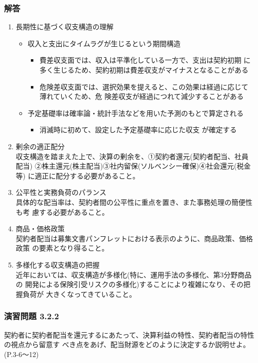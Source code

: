 \documentclass[report,gutter=10mm,fore-edge=10mm,uplatex,dvipdfmx]{jlreq}
\begin{document}
\subsubsection{解答}
\begin{enumerate}
 \item 長期性に基づく収支構造の理解
\begin{itemize}
 \item 収入と支出にタイムラグが生じるという期間構造
\begin{itemize}
 \item 費差収支面では、収入は平準化している一方で、支出は契約初期
に多く生じるため、契約初期は費差収支がマイナスとなることがある
 \item 危険差収支面では、選択効果を提えると、この効果は経過に応じて薄れていくため、危
険差収支が経過につれて減少することがある
\end{itemize}
 \item 予定基礎率は確率論・統計手法などを用いた予測のもとで算定される
\begin{itemize}
 \item 消滅時に初めて、設定した予定基礎率に応じた収支
が確定する
\end{itemize}
\end{itemize}
 \item 剰余の適正配分\\
収支構造を踏まえた上で、決算の剰余を、①契約者還元(契約者配当、社員配当)
②株主還元(株主配当)③社内留保(ソルベンシー確保)④社会還元(税金等)
に適正に配分する必要があること。
 \item 公平性と実務負荷のパランス\\
具体的な配当率は、契約者間の公平性に重点を置き、また事務処理の簡便性も考
慮する必要があること。
 \item 商品・価格政策\\
契約者配当は募集文書パンフレットにおける表示のように、商品政策、価格政策
の要素となり得ること。
 \item 多様化する収支構造の把握\\
近年においては、収支構造が多様化(特に、運用手法の多様化、第3分野商品の
開発による保険引受リスクの多様化)することにより複雑になり、その把握負荷が
大きくなってきていること。
\end{enumerate}
\subsubsection{演習問題 3.2.2}
契約者に契約者配当を還元するにあたって、決算利益の特性、契約者配当の特性の視点から留意す
べき点をあげ、配当財源をどのように決定するか説明せよ。
(P.3-6～12)
\end{document}
